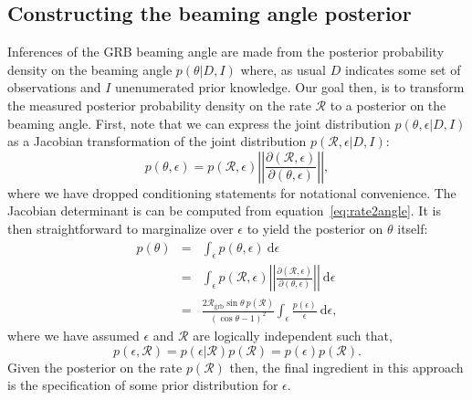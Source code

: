 \documentclass[twocolumn,nofootinbib]{revtex4-1}
\newcommand{\grbrate}{{{\mathcal R}_{\mathrm{grb}}}}
\newcommand{\cbcrate}{{{\mathcal R}}}
\newcommand{\diff}{{\mathrm d}}
\begin{document}
\subsection{Constructing the beaming angle posterior}
Inferences of the GRB beaming angle are made from the posterior probability
density on the beaming angle $p(\theta|D,I)$ where, as usual $D$ indicates some
set of observations and $I$ unenumerated prior knowledge.  Our goal then, is to
transform the measured posterior probability density on the rate $\cbcrate$ to a
posterior on the beaming angle.
%
First, note that we can express the joint distribution $p(\theta, \epsilon|D,I)$
as a Jacobian transformation of the joint distribution $p(\cbcrate,
\epsilon|D,I)$:
\begin{equation}
p(\theta,\epsilon) = p(\cbcrate,\epsilon)
\left\lvert\left\lvert
\frac{\partial(\cbcrate,\epsilon)}{\partial(\theta,\epsilon)}
\right\rvert\right\rvert,
\end{equation}
%
where we have dropped conditioning statements for notational convenience.  The
Jacobian determinant is can be  computed from equation~\ref{eq:rate2angle}.  It
is then straightforward to marginalize over $\epsilon$ to yield the posterior
on $\theta$ itself:
%
\begin{eqnarray}
    p(\theta) & = & \int_{\epsilon} p(\theta,\epsilon)~\diff \epsilon\\
              & = & \int_{\epsilon} p(\cbcrate,\epsilon)
    \left\lvert\left\lvert
    \frac{\partial(\cbcrate,\epsilon)}{\partial(\theta,\epsilon)}
    \right\rvert\right\rvert~\diff \epsilon \\
              & = & \frac{2\grbrate \sin
\theta~p(\cbcrate)}{(\cos\theta-1)^2}\int_{\epsilon}
\frac{p(\epsilon)}{\epsilon} ~\diff \epsilon,
\end{eqnarray}
%
where we have assumed $\epsilon$ and $\cbcrate$ are logically independent such
that,
\begin{equation}
p(\epsilon,\cbcrate) = p(\epsilon|\cbcrate)p(\cbcrate) = p(\epsilon)p(\cbcrate).
\end{equation}
%
Given the posterior on the rate $p(\cbcrate)$ then, the final ingredient in this
approach is the specification of some prior distribution for $\epsilon$.
\end{document}
